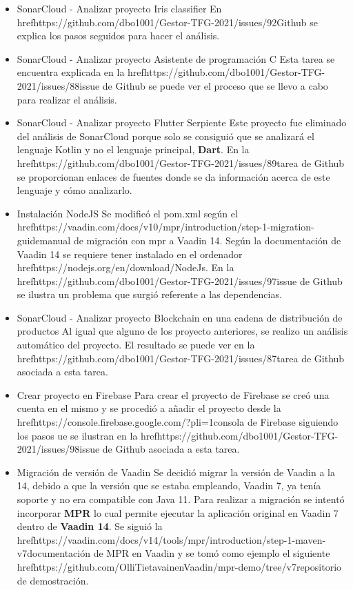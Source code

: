 \begin{itemize}
	\item SonarCloud - Analizar proyecto Iris classifier
		En href{https://github.com/dbo1001/Gestor-TFG-2021/issues/92}{Github} se explica los pasos seguidos para hacer el análisis.
	\item SonarCloud - Analizar proyecto Asistente de programación C
		Esta tarea se encuentra explicada en la href{https://github.com/dbo1001/Gestor-TFG-2021/issues/88}{issue de Github} se puede ver el proceso que se llevo a cabo para realizar el análisis.
	\item SonarCloud - Analizar proyecto Flutter Serpiente
		Este proyecto fue eliminado del análisis de SonarCloud porque solo se consiguió que se analizará el lenguaje Kotlin y no el lenguaje principal, \textbf{Dart}. En la href{https://github.com/dbo1001/Gestor-TFG-2021/issues/89}{tarea de Github} se proporcionan enlaces de fuentes donde se da información acerca de este lenguaje y cómo analizarlo. 
	\item Instalación NodeJS
		Se modificó el pom.xml según el href{https://vaadin.com/docs/v10/mpr/introduction/step-1-migration-guide}{manual de migración con mpr a Vaadin 14}. Según la documentación de Vaadin 14 se requiere tener instalado en el ordenador href{https://nodejs.org/en/download/}{NodeJs}. En la href{https://github.com/dbo1001/Gestor-TFG-2021/issues/97}{issue de Github} se ilustra un problema que surgió referente a las dependencias. 
	\item SonarCloud - Analizar proyecto Blockchain en una cadena de distribución de productos
		Al igual que alguno de los proyecto anteriores, se realizo un análisis automático del proyecto. El resultado se puede ver en la href{https://github.com/dbo1001/Gestor-TFG-2021/issues/87}{tarea de Github} asociada a esta tarea.
	\item Crear proyecto en Firebase
		Para crear el proyecto de Firebase se creó una cuenta en el mismo y se procedió a añadir el proyecto desde la href{https://console.firebase.google.com/?pli=1}{consola de Firebase} siguiendo los pasos ue se ilustran en la href{https://github.com/dbo1001/Gestor-TFG-2021/issues/98}{issue de Github} asociada a esta tarea.
	\item Migración de versión de Vaadin
		Se decidió migrar la versión de Vaadin a la 14, debido a que la versión que se estaba empleando, Vaadin 7, ya tenía soporte y no era compatible con Java 11. Para realizar a migración se intentó incorporar \textbf{MPR} lo cual permite ejecutar la aplicación original en Vaadin 7 dentro de \textbf{Vaadin 14}. Se siguió la href{https://vaadin.com/docs/v14/tools/mpr/introduction/step-1-maven-v7}{documentación de MPR en Vaadin} y se tomó como ejemplo el siguiente href{https://github.com/OlliTietavainenVaadin/mpr-demo/tree/v7}{repositorio de demostración}.

\end{itemize}
